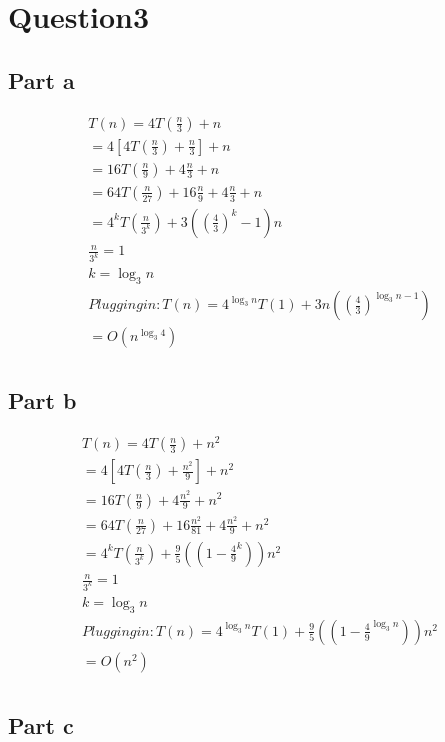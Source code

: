 \documentclass{article}
\begin{document}
\section*{Question3}

\subsection*{Part a}

\begin{align}
T(n)=4T(\frac{n}{3}) + n\\
    =4[4T(\frac{n}{3}) + \frac{n}{3}] + n\\
    =16T(\frac{n}{9})+ 4\frac{n}{3} + n\\
    =64T(\frac{n}{27})+ 16\frac{n}{9}+4\frac{n}{3} + n\\
    =4^kT(\frac{n}{3^k}) + 3((\frac{4}{3})^k-1)n\\
\frac{n}{3^k}=1\\
k=\log_3 n\\
Plugging in:
T(n)=4^{\log_3 n}T(1)+3n((\frac{4}{3})^{\log_3 n-1})\\
    =O(n^{\log_3 4})\\
\end{align}


\subsection*{Part b}

\begin{align}
T(n)=4T(\frac{n}{3}) + n^2\\
    =4[4T(\frac{n}{3}) + \frac{n^2}{9}] + n^2\\
    =16T(\frac{n}{9})+ 4\frac{n^2}{9} + n^2\\
    =64T(\frac{n}{27})+ 16\frac{n^2}{81}+4\frac{n^2}{9} + n^2\\
    =4^kT(\frac{n}{3^k}) + \frac{9}{5}((1-\frac{4}{9}^k))n^2\\
\frac{n}{3^k}=1\\
k=\log_3 n\\
Plugging in:
T(n)=4^{\log_3 n}T(1)+\frac{9}{5}((1-\frac{4}{9}^{\log_3 n}))n^2\\
    =O(n^2)\\
\end{align}


\subsection*{Part c}
\end{document}
